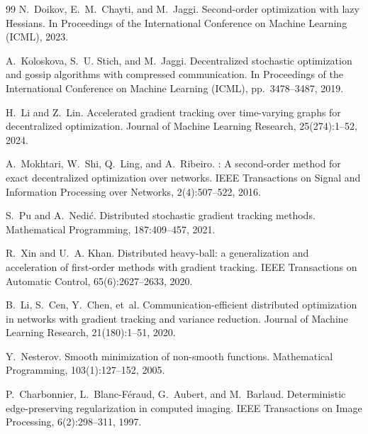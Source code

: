 \documentclass[review,onefignum,onetabnum]{siamart171218}
\begin{document}
\begin{thebibliography}{99}
		N.~Doikov, E.~M.~Chayti, and M.~Jaggi.
		\newblock Second-order optimization with lazy {H}essians.
		\newblock In Proceedings of the International Conference on Machine Learning (ICML), 2023.
		
		A.~Koloskova, S.~U. Stich, and M.~Jaggi.
		\newblock Decentralized stochastic optimization and gossip algorithms with compressed communication.
		\newblock In Proceedings of the International Conference on Machine Learning (ICML), pp.~3478--3487, 2019.
		
		H.~Li and Z.~Lin.
		\newblock Accelerated gradient tracking over time-varying graphs for decentralized optimization.
		\newblock Journal of Machine Learning Research, 25(274):1--52, 2024.
		
		A.~Mokhtari, W.~Shi, Q.~Ling, and A.~Ribeiro.
		: A second-order method for exact decentralized optimization over networks.
		\newblock IEEE Transactions on Signal and Information Processing over Networks, 2(4):507--522, 2016.
		
		S.~Pu and A.~Nedi{\'c}.
		\newblock Distributed stochastic gradient tracking methods.
		\newblock Mathematical Programming, 187:409--457, 2021.
		
		R.~Xin and U.~A. Khan.
		\newblock Distributed heavy-ball: a generalization and acceleration of first-order methods with gradient tracking.
		\newblock IEEE Transactions on Automatic Control, 65(6):2627--2633, 2020.
		
		B.~Li, S.~Cen, Y.~Chen, et~al.
		\newblock Communication-efficient distributed optimization in networks with gradient tracking and variance reduction.
		\newblock Journal of Machine Learning Research, 21(180):1--51, 2020.

		Y.~Nesterov.
		\newblock Smooth minimization of non-smooth functions.
		\newblock Mathematical Programming, 103(1):127--152, 2005.

		P.~Charbonnier, L.~Blanc-F{\'e}raud, G.~Aubert, and M.~Barlaud.
		\newblock Deterministic edge-preserving regularization in computed imaging.
		\newblock IEEE Transactions on Image Processing, 6(2):298--311, 1997.


\end{thebibliography}
\end{document}
